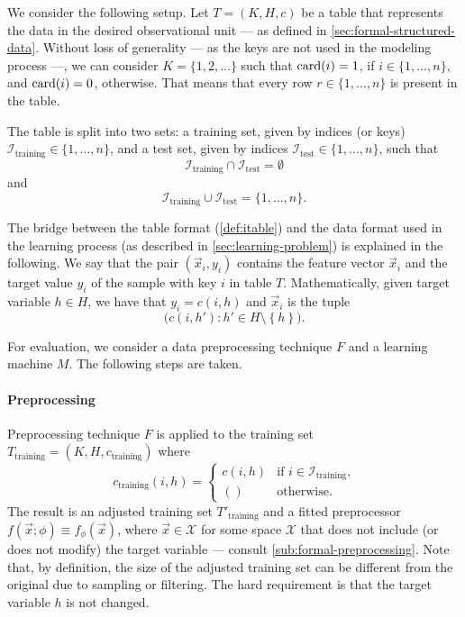 We consider the following setup.  Let $T = (K, H, c)$ be a table that represents the data
in the desired observational unit --- as defined in \cref{sec:formal-structured-data}.
Without loss of generality --- as the keys are not used in the modeling process ---, we
can consider $K = \{1, 2, \dots\}$ such that $\rowcard[i] = 1$, if $i \in \{1, \dots,
n\}$, and $\rowcard[i] = 0$, otherwise.  That means that every row $r \in \{1, \dots, n\}$
is present in the table.

The table is split into two sets: a training set, given by indices (or keys)
$\mathcal{I}_\text{training} \in \{1, \dots, n\}$, and a test set, given by indices
$\mathcal{I}_\text{test} \in \{1, \dots, n\}$, such that $$\mathcal{I}_\text{training}
\cap \mathcal{I}_\text{test} = \emptyset$$ and $$\mathcal{I}_\text{training} \cup
\mathcal{I}_\text{test} = \{1,\dots,n\}\text{.}$$

The bridge between the table format (\cref{def:itable}) and the data format used in the
learning process (as described in \cref{sec:learning-problem}) is explained in the
following.  We say that the pair $(\vec{x}_i, y_i)$ contains the feature vector $\vec{x}_i$
and the target value $y_i$ of the sample with key $i$ in table $T$.  Mathematically,
given target variable $h \in H$, we have that $y_i = c(i, h)$ and $\vec{x}_i$ is the tuple
$$\big(c(i, h') : h' \in H \setminus \left\{ h \right\}\big)\text{.}$$

For evaluation, we consider a data preprocessing technique $F$ and a learning machine
$M$.  The following steps are taken.

\paragraph{Preprocessing}

Preprocessing technique $F$ is applied to the training set $T_\text{training} = (K, H,
c_\text{training})$ where \[
  c_\text{training}(i, h) = \begin{cases}
    c(i, h) & \text{if } i \in \mathcal{I}_\text{training}\text{,} \\
    () & \text{otherwise}\text{.}
  \end{cases}
\]  The result is an adjusted training set $T'_\text{training}$ and a fitted
preprocessor $f(\vec{x}; \phi) \equiv f_\phi(\vec{x})$, where $\vec{x} \in \mathcal{X}$
for some space $\mathcal{X}$ that does not include (or does not modify) the target
variable --- consult \cref{sub:formal-preprocessing}.  Note that, by definition, the size
of the adjusted training set can be different from the original due to sampling or
filtering.  The hard requirement is that the target variable $h$ is not changed.


